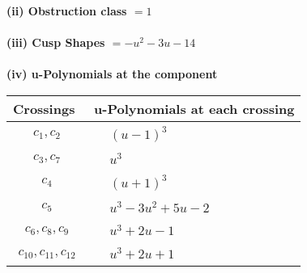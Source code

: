 \documentclass[1p]{elsarticle_modified}
\theoremstyle{definition}
\begin{document}
\flushleft \textbf{(ii) Obstruction class $= 1$}\\~\\
\flushleft \textbf{(iii) Cusp Shapes $= - u^2-3 u-14$}\\~\\
\newpage\renewcommand{\arraystretch}{1}
\flushleft \textbf{(iv) u-Polynomials at the component}\newline \\
\begin{tabular}{m{50pt}|m{274pt}}
Crossings & \hspace{64pt}u-Polynomials at each crossing \\
\hline $$\begin{aligned}c_{1},c_{2}\end{aligned}$$&$\begin{aligned}
&(u-1)^3
\end{aligned}$\\
\hline $$\begin{aligned}c_{3},c_{7}\end{aligned}$$&$\begin{aligned}
&u^3
\end{aligned}$\\
\hline $$\begin{aligned}c_{4}\end{aligned}$$&$\begin{aligned}
&(u+1)^3
\end{aligned}$\\
\hline $$\begin{aligned}c_{5}\end{aligned}$$&$\begin{aligned}
&u^3-3 u^2+5 u-2
\end{aligned}$\\
\hline $$\begin{aligned}c_{6},c_{8},c_{9}\end{aligned}$$&$\begin{aligned}
&u^3+2 u-1
\end{aligned}$\\
\hline $$\begin{aligned}c_{10},c_{11},c_{12}\end{aligned}$$&$\begin{aligned}
&u^3+2 u+1
\end{aligned}$\\
\hline
\end{tabular}\\~\\
\newpage\renewcommand{\arraystretch}{1}
\end{document}
